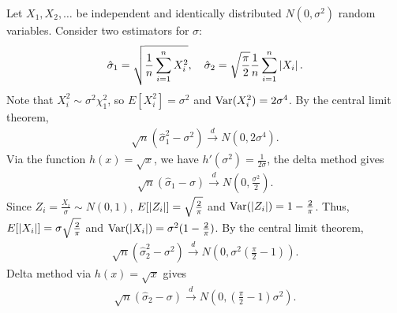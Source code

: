 \begin{example}
    Let $X_{1},X_{2},\ldots$ be independent and identically distributed $N(0,\sigma^{2})$ random variables. Consider two estimators for $\sigma$:
    \begin{align}
        \hat{\sigma}_{1} = \sqrt{\frac{1}{n} \sum_{i=1}^{n} X_{i}^{2}},\quad \hat{\sigma}_{2} = \sqrt{\frac{\pi}{2}} \frac{1}{n} \sum_{i=1}^{n} \left| X_{i} \right|.
    \end{align}
    Note that $X_{i}^{2} \sim \sigma^{2} \chi^{2}_{1}$, so $E[X_{i}^{2}] = \sigma^{2}$ and $\operatorname{Var}(X_{i}^{2}) = 2\sigma^{4}$. By the central limit theorem,
    \begin{align}
        \sqrt{n}(\hat{\sigma}_{1}^{2} - \sigma^{2}) \xrightarrow{d} N(0,2\sigma^{4}).
    \end{align}
    Via the function $h(x) = \sqrt{x}$, we have $h'(\sigma^{2}) = \frac{1}{2\sigma}$, the delta method gives
    \begin{align}
        \sqrt{n}(\hat{\sigma}_{1} - \sigma) \xrightarrow{d} N(0,\frac{\sigma^{2}}{2}).
    \end{align}
    Since $Z_{i} = \frac{X_{i}}{\sigma} \sim N(0,1)$, $E[\left| Z_{i} \right|] = \sqrt{\frac{2}{\pi}}$ and $\operatorname{Var}(\left| Z_{i} \right|) = 1 - \frac{2}{\pi}$. Thus, $E[\left| X_{i} \right|] = \sigma \sqrt{\frac{2}{\pi}}$ and $\operatorname{Var}(\left| X_{i} \right|) = \sigma^{2}(1-\frac{2}{\pi})$. By the central limit theorem,
    \begin{align}
        \sqrt{n}(\hat{\sigma}_{2}^{2} - \sigma^{2}) \xrightarrow{d} N(0,\sigma^{2}(\frac{\pi}{2}-1)).
    \end{align}
    Delta method via $h(x) = \sqrt{x}$ gives
    \begin{align}
        \sqrt{n}(\hat{\sigma}_{2} - \sigma) \xrightarrow{d} N(0,(\frac{\pi}{2}-1)\sigma^{2}).
    \end{align}
\end{example}